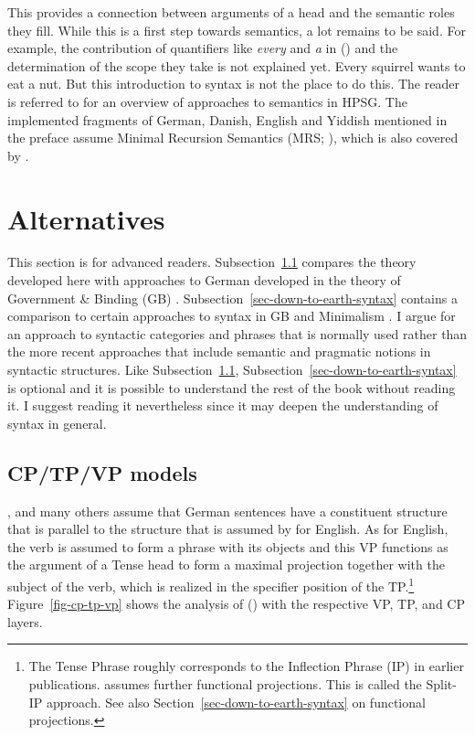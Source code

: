 \noindent
This provides a connection between arguments of a head and the semantic roles they fill. While this
is a first step towards semantics, a lot remains to be said. For example, the contribution of
quantifiers like \emph{every} and \emph{a} in () and the determination of the scope they take is not explained yet. 
\ea
Every squirrel wants to eat a nut.
\z
But this introduction to syntax is not the place to do this. The reader is referred to
 for an overview of approaches to semantics in HPSG. The implemented fragments of
German, Danish, English and Yiddish mentioned in the preface assume Minimal Recursion Semantics (MRS; \citealt{CFPS2005a}), which is
also covered by \citet[Section~6.1]{KoenigRichter2021a}.


\section{Alternatives}

This section is for advanced readers. Subsection~\ref{sec-cp-tp-vp} compares the theory developed here with approaches to
German developed in the theory of Government \& Binding (GB)
\citep{Chomsky81a,Chomsky86b}. Subsection~\ref{sec-down-to-earth-syntax} contains a comparison to
certain approaches to syntax in GB and Minimalism \citep{Chomsky95a-u}. I argue for an approach to
syntactic categories and phrases that is normally used rather than the more recent approaches that
include semantic and pragmatic notions in syntactic structures. Like
Subsection~\ref{sec-cp-tp-vp}, Subsection~\ref{sec-down-to-earth-syntax} is optional and it is
possible to understand the rest of the book without reading it. I suggest reading it nevertheless
since it may deepen the understanding of syntax in general.



\subsection{CP/TP/VP models}
\label{sec-cp-tp-vp}\label{sec-cp-tp-vp-scrambling}
\label{sec-discussion-scope}

\largerpage
\citet{Grewendorf88a,Grewendorf93}, \citet{Lohnstein2014a} and many others assume that German
sentences have a constituent structure that is parallel to the structure that is assumed by
\citet{Chomsky86b} for English. As for English, the verb is
assumed to form a phrase with its objects and this VP functions as the argument of a Tense head to
form a maximal projection together with the subject of the verb, which is realized in the specifier
position of the TP.\footnote{
The Tense Phrase roughly corresponds to the Inflection Phrase (IP) in earlier
publications. \citet[]{Pollock89a-u} assumes further functional projections. This is called the
Split-IP approach. See also Section~\ref{sec-down-to-earth-syntax} on functional projections.
} Figure~\ref{fig-cp-tp-vp} shows the analysis of () with the respective
VP, TP, and CP layers.

